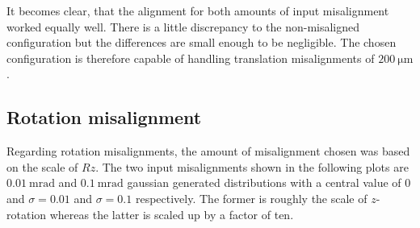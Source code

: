 It becomes clear, that the alignment for both amounts of input misalignment worked equally well. There is a little discrepancy to the non-misaligned configuration but the differences are small enough to be negligible.
The chosen configuration is therefore capable of handling translation misalignments of $\SI{200}{\micro\metre}$.

\subsection{Rotation misalignment}
\label{sec:misR}

Regarding rotation misalignments, the amount of misalignment chosen was based on the scale of $Rz$.
The two input misalignments shown in the following plots are $\SI{0.01}{\milli\radian}$ and $\SI{0.1}{\milli\radian}$ gaussian generated distributions with a central value of 0 and $\sigma = 0.01$ and $\sigma = 0.1$ respectively. The former is roughly the scale of $z$-rotation whereas the latter is scaled up by a factor of ten.


